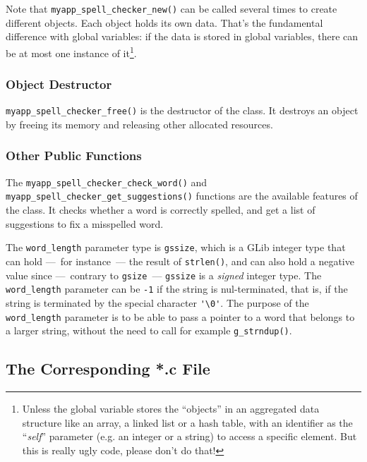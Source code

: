 Note that \lstinline{myapp_spell_checker_new()} can be called several times to create different objects. Each object holds its own data. That's the fundamental difference with global variables: if the data is stored in global variables, there can be at most one instance of it\footnote{Unless the global variable stores the ``objects'' in an aggregated data structure like an array, a linked list or a hash table, with an identifier as the ``\emph{self}'' parameter (e.g. an integer or a string) to access a specific element. But this is really ugly code, please don't do that!}.


\subsubsection{Object Destructor}
\lstinline{myapp_spell_checker_free()} is the destructor of the class. It destroys an object by freeing its memory and releasing other allocated resources.

\subsubsection{Other Public Functions}
The \lstinline{myapp_spell_checker_check_word()} and \lstinline{myapp_spell_checker_get_suggestions()} functions are the available features of the class. It checks whether a word is correctly spelled, and get a list of suggestions to fix a misspelled word.

The \lstinline{word_length} parameter type is \lstinline{gssize}, which is a GLib integer type that can hold ---~for instance~--- the result of \lstinline{strlen()}, and can also hold a negative value since ---~contrary to \lstinline{gsize}~--- \lstinline{gssize} is a \emph{signed} integer type. The \lstinline{word_length} parameter can be \lstinline{-1} if the string is nul-terminated, that is, if the string is terminated by the special character \lstinline{'\0'}. The purpose of the \lstinline{word_length} parameter is to be able to pass a pointer to a word that belongs to a larger string, without the need to call for example \lstinline{g_strndup()}.

\subsection{The Corresponding *.c File}

